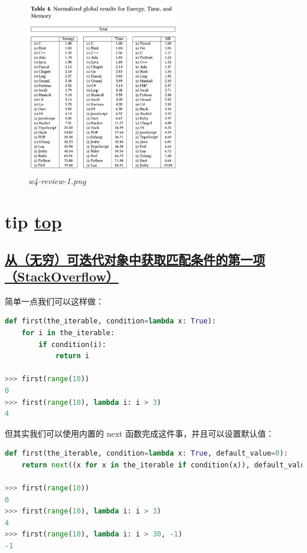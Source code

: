 \begin{figure}[htbp]
  \centering
    \includegraphics[width=0.6\textwidth]{../images/2020/11/w4-review-1.png}
  \caption{\textit{w4-review-1.png}}
\end{figure}

\section{tip \hyperref[chap:w4]{top}}\label{w4:tip}

\subsection{\href{https://stackoverflow.com/questions/2361426/get-the-first-item-from-an-iterable-that-matches-a-condition}{从（无穷）可迭代对象中获取匹配条件的第一项（StackOverflow）}}

简单一点我们可以这样做：

\begin{lstlisting}[language=Python]
def first(the_iterable, condition=lambda x: True):
	for i in the_iterable:
		if condition(i):
			return i

>>> first(range(10))
0
>>> first(range(10), lambda i: i > 3)
4
\end{lstlisting}

但其实我们可以使用内置的 next 函数完成这件事，并且可以设置默认值：

\begin{lstlisting}[language=Python]
def first(the_iterable, condition=lambda x: True, default_value=0):
	return next((x for x in the_iterable if condition(x)), default_value)

>>> first(range(10))
0
>>> first(range(10), lambda i: i > 3)
4
>>> first(range(10), lambda i: i > 30, -1)
-1
\end{lstlisting}

